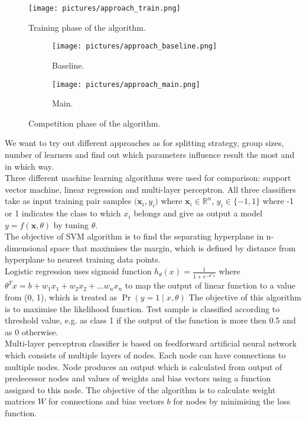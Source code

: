 \documentclass{scrartcl}
\begin{document}
\begin{figure}[H]
  \begin{center}
    \texttt{[image: pictures/approach\_train.png]}
  \end{center}
  \caption{Training phase of the algorithm.}
  \label{fig:approach_train}
\end{figure}
\begin{figure}[H]
  \centering
  \begin{subfigure}[b]{0.45\linewidth}
    \texttt{[image: pictures/approach\_baseline.png]}
    \caption{Baseline.}
  \end{subfigure}\hfill%
  \begin{subfigure}[b]{0.45\linewidth}
    \texttt{[image: pictures/approach\_main.png]}
    \caption{Main.}
  \end{subfigure}
  \caption{Competition phase of the algorithm.}
  \label{fig:approach}
\end{figure}

We want to try out different approaches as for splitting strategy, group sizes, number of learners and find out which parameters influence result the most and in which way.\\
Three different machine learning algorithms were used for comparison: support vector machine, linear regression and multi-layer perceptron. 
All three classifiers take as input training pair samples $\big( \mathbf x_i, y_i \big)$ where  $\mathbf x_i \in \mathbb{R}^n$, $y_i \in \{ -1, 1\}$ where -1 or 1 indicates the class to which $x_i$ belongs and give as output a model $y = f(\mathbf x, \theta)$ by tuning $\theta$. \\

The objective of SVM algorithm is to find the separating hyperplane in n-dimensional space that maximises the margin, which is defined by distance from hyperplane to nearest training data points.\\
Logistic regression uses sigmoid function $h_ \theta (x) =  \frac{\mathrm{1} }{\mathrm{1} + e^{-\theta^Tx} }  $  where  $ \theta^Tx = b + w_1x_1 + w_2x_2 + ... w_nx_n$ to map the output of linear function to a value from \big(0, 1\big), which is treated as $\Pr( y = 1 \mid x, \theta)$ The objective of this algorithm is to maximise the likelihood function. Test sample is classified according to threshold value, e.g. as class 1 if the output of the function is more then 0.5 and as 0 otherwise. \\
Multi-layer perceptron classifier is based on feedforward artificial neural network which consists of multiple layers of nodes. Each node can have connections to multiple nodes. Node produces an output which is calculated from output of predecessor nodes and values of weights and bias vectors using a function assigned to this node. The objective of the algorithm is to calculate weight matrices $W$ for connections  and bias vectors $b$ for nodes by minimising the loss function.
\end{document}
